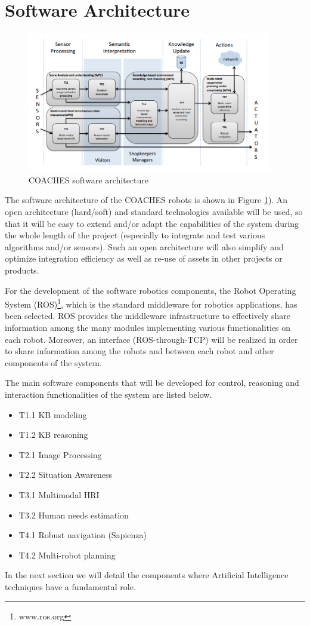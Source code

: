 \section{Software Architecture}

\begin{figure}
\centering
\includegraphics[width=0.95\textwidth]{fig/COACHES_swarch.png}
\caption{COACHES software architecture}
\label{fig:swarch}
\end{figure}

The software architecture of the COACHES robots is shown in Figure \ref{fig:swarch}).
An open architecture (hard/soft) and standard technologies available will be used, 
so that it will be easy to extend and/or adapt the capabilities of the system during the whole length of 
the  project  (especially  to  integrate  and  test  various  algorithms  and/or  sensors).  
Such an open architecture will also simplify and optimize integration efficiency as well as re-use of assets in other projects or products. 


For the development of the software robotics components, the Robot Operating System (ROS)\footnote{www.ros.org}, which is the standard middleware for robotics applications, has been selected.
ROS provides the middleware infrastructure to effectively share information among the many modules implementing various functionalities on each robot. Moreover, an interface (ROS-through-TCP) will be realized in order to share information among the robots and between each robot and other components of the system.

The main software components that will be developed for control, reasoning and interaction functionalities of the system are listed below.

\begin{itemize}
\item T1.1 KB modeling
\item T1.2 KB reasoning
\item T2.1 Image Processing
\item T2.2 Situation Awareness
\item T3.1 Multimodal HRI
\item T3.2 Human needs estimation
\item T4.1 Robust navigation (Sapienza)
\item T4.2 Multi-robot planning
\end{itemize}

In the next section we will detail the components where Artificial Intelligence techniques have a fundamental role.



